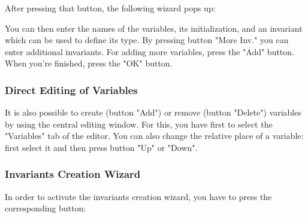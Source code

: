 
After pressing that button, the following wizard pops up: 


You can then enter the names of the variables, its initialization, and an invariant which can be used to define its type. By pressing button "More Inv." you can enter additional invariants. For adding more variables, press the "Add" button. When you’re finished, press the "OK" button. 

\subsubsection{Direct Editing of Variables}

It is also possible to create (button "Add") or remove (button "Delete") variables by using the central editing window. For this, you have first to select the "Variables" tab of the editor. You can also change the relative place of a variable: first select it and then press button "Up" or "Down". 


\subsubsection{Invariants Creation Wizard}

In order to activate the invariants creation wizard, you have to press the corresponding button:

